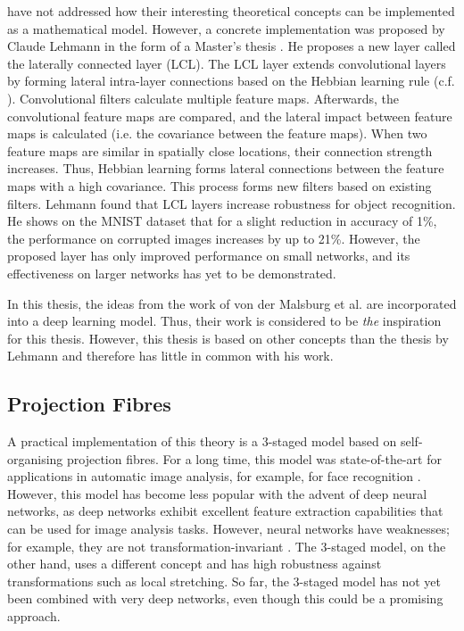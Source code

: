  have not addressed how their interesting theoretical concepts can be implemented as a mathematical model.
However, a concrete implementation was proposed by Claude Lehmann in the form of a Master's thesis .
He proposes a new layer called the laterally connected layer (LCL).
The LCL layer extends convolutional layers by forming lateral intra-layer connections based on the Hebbian learning rule (c.f. ).
Convolutional filters calculate multiple feature maps.
Afterwards, the convolutional feature maps are compared, and the lateral impact between feature maps is calculated (i.e. the covariance between the feature maps).
When two feature maps are similar in spatially close locations, their connection strength increases.
Thus, Hebbian learning forms lateral connections between the feature maps with a high covariance.
This process forms new filters based on existing filters.
Lehmann found that LCL layers increase robustness for object recognition.
He shows on the MNIST dataset \cite{lecun_gradient-based_1998} that for a slight reduction in accuracy of 1\%, the performance on corrupted images increases by up to 21\%.
However, the proposed layer has only improved performance on small networks, and its effectiveness on larger networks has yet to be demonstrated.

In this thesis, the ideas from the work of von der Malsburg et al. \cite{von_der_malsburg_theory_2022} are incorporated into a deep learning model.
Thus, their work is considered to be \emph{the} inspiration for this thesis.
However, this thesis is based on other concepts than the thesis by Lehmann \cite{lehmann_leveraging_2022} and therefore has little in common with his work.


\subsection{Projection Fibres}
A practical implementation of this theory is a $3$-staged model based on self-organising projection fibres.
For a long time, this model was state-of-the-art for applications in automatic image analysis, for example, for face recognition .
However, this model has become less popular with the advent of deep neural networks, as deep networks exhibit excellent feature extraction capabilities that can be used for image analysis tasks.
However, neural networks have weaknesses; for example, they are not transformation-invariant .
The $3$-staged model, on the other hand, uses a different concept and has high robustness against transformations such as local stretching. So far, the $3$-staged model has not yet been combined with very deep networks, even though this could be a promising approach.

